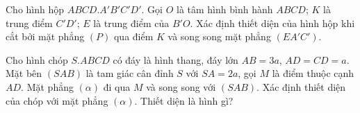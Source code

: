 \begin{bt}%
	Cho hình hộp $ABCD.A'B'C'D'$. Gọi $O$ là tâm hình bình hành $ABCD$; $K$ là trung điểm $C'D'$; $E$ là trung điểm của $B'O$. Xác định thiết diện của hình hộp khi cắt bởi mặt phẳng $(P)$ qua điểm $K$ và song song mặt phẳng $(EA'C')$.
\end{bt}
\begin{bt}%
	Cho hình chóp $S.ABCD$ có đáy là hình thang, đáy lớn $AB=3a$, $AD=CD=a$. Mặt bên $(SAB)$ là tam giác cân đỉnh $S$ với $SA=2a$, gọi $M$ là điểm thuộc cạnh $AD$. Mặt phẳng $(\alpha)$ đi qua $M$ và song song với $(SAB)$. Xác định thiết diện của chóp với mặt phẳng $(\alpha)$. Thiết diện là hình gì?
\end{bt}

